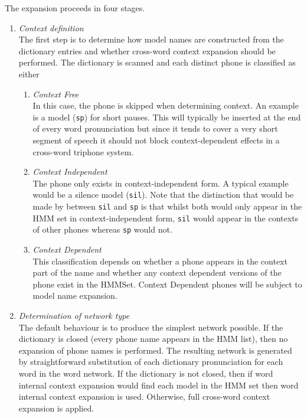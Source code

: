 The expansion proceeds in four stages.
\begin{enumerate}
\item \textit{Context definition} \\
The first step is to determine how model
names are constructed from the dictionary entries and whether
cross-word context expansion should be performed.
The dictionary is scanned and each distinct phone is 
classified as either
\begin{enumerate}
\item \textit{Context Free} \\
   In this case, the phone is skipped when determining context.
   An example is a model (\texttt{sp}) for short pauses.
   This will typically be inserted at the end of every word
    pronunciation but since it tends to cover a very short 
    segment of speech it should not block context-dependent
    effects in a cross-word triphone system.
\item \textit{Context Independent} \\
   The phone only exists in context-independent form.  A typical
   example would be a silence model (\texttt{sil}).
   Note that the distinction that would be made by  between
   \texttt{sil} and \texttt{sp} is that whilst both would
   only appear in the HMM set
   in context-independent form, \texttt{sil} would appear in the contexts
   of other phones whereas \texttt{sp} would not.
\item \textit{Context Dependent}  \\
        This classification depends on whether a phone appears in the context
        part of the name and whether
        any context dependent versions of the phone exist in the HMMSet.
         Context Dependent phones will be subject to model name expansion.
\end{enumerate}

\item \textit{Determination of network type} \\
The default behaviour is to produce the simplest network
possible. If the dictionary is closed (every phone name appears
in the HMM list), then no expansion of phone names is performed.
The resulting network is generated by straightforward
substitution of each dictionary pronunciation for each
word in the word network.  If the dictionary is not closed, 
then if word internal context expansion
would find each model in the HMM set then  word internal 
context expansion is used.
Otherwise, full cross-word
context expansion is applied.


\end{enumerate}
